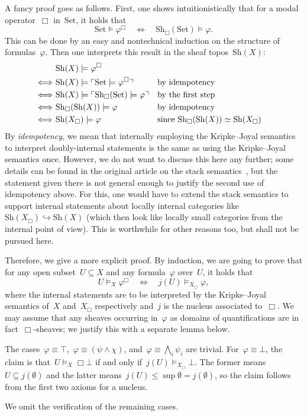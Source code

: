 \documentclass[10pt,reqno,a4paper]{amsbook}
\makeatletter
\theoremstyle{definition}
\theoremstyle{plain}
\theoremstyle{remark}
\newcommand{\Set}{\mathrm{Set}}
\newcommand{\Sh}{\mathrm{Sh}}
\newcommand{\?}{\,{:}\,}
\renewcommand{\_}{\mathpunct{.}\,}
\newcommand{\speak}[1]{\ulcorner\text{\textnormal{#1}}\urcorner}
\renewenvironment{proof}[1][\proofname]{\par
  \pushQED{\qed}%
  \normalfont \topsep6\p@\@plus6\p@\relax
  \trivlist
  \item[\hskip\labelsep
        \itshape
    #1\@addpunct{.}]\ignorespaces
}{%
  \popQED\endtrivlist\@endpefalse
}
\makeatother
\begin{document}
\begin{proof}[Proof of Theorem~\ref{thm:box-translation-semantically}]
A fancy proof goes as follows. First, one shows intuitionistically that for a
modal operator~$\Box$ in~$\Set$, it holds that
\[ \Set \models \varphi^\Box \quad\Longleftrightarrow\quad
  \Sh_\Box(\Set) \models \varphi. \]
This can be done by an easy and nontechnical induction on the structure of
formulas~$\varphi$. Then one interprets this result in the sheaf topos~$\Sh(X)$:
\begin{align*}
  &\ \Sh(X) \models \varphi^\Box \\
  \Longleftrightarrow&\
  \Sh(X) \models \speak{$\Set \models \varphi^\Box$} &&\text{by idempotency}\\
  \Longleftrightarrow&\
  \Sh(X) \models \speak{$\Sh_\Box(\Set) \models \varphi$} &&\text{by the first step} \\
  \Longleftrightarrow&\
  \Sh_\Box(\Sh(X)) \models \varphi &&\text{by idempotency} \\
  \Longleftrightarrow&\
  \Sh(X_\Box) \models \varphi &&\text{since~$\Sh_\Box(\Sh(X)) \simeq
  \Sh(X_\Box)$}
\end{align*}
By \emph{idempotency}, we mean that internally employing the Kripke--Joyal
semantics to interpret doubly-internal statements is the same as using the
Kripke--Joyal semantics once. However, we do not want to discuss this here any further;
some details can be found in the original article on the stack
semantics~\cite[Lemma~7.20]{shulman:stack}, but the statement given there is not
general enough to justify the second use of idempotency above. For this, one
would have to extend the stack semantics to support internal statements about
locally internal categories like~$\Sh(X_\Box) \hookrightarrow \Sh(X)$ (which
then look like locally small categories from the internal point of view). This
is worthwhile for other reasons too, but shall not be pursued here.

Therefore, we give a more explicit proof. By induction, we are going to prove
that for any open subset~$U \subseteq X$ and any formula~$\varphi$ over~$U$, it
holds that
\[ U \models_X \varphi^\Box \quad\Longleftrightarrow\quad j(U) \models_{X_\Box}
\varphi, \]
where the internal statements are to be interpreted by the Kripke--Joyal
semantics of~$X$ and~$X_\Box$ respectively and~$j$ is the nucleus associated
to~$\Box$. We may assume that any sheaves occurring in~$\varphi$ as domains of
quantifications are in fact~$\Box$-sheaves; we justify this with a separate lemma
below.

The cases~$\varphi \equiv \top$,~$\varphi \equiv (\psi \wedge \chi)$,
and~$\varphi \equiv \bigwedge_i \psi_i$ are trivial. For~$\varphi \equiv \bot$,
the claim is that~$U \models_X \Box\bot$ if and only if~$j(U)
\models_{X_\Box} \bot$. The former means~$U \subseteq j(\emptyset)$ and the
latter means~$j(U) \leq \sup \emptyset = j(\emptyset)$, so the claim follows from
the first two axioms for a nucleus.

We omit the verification of the remaining cases.
\end{proof}
\end{document}

